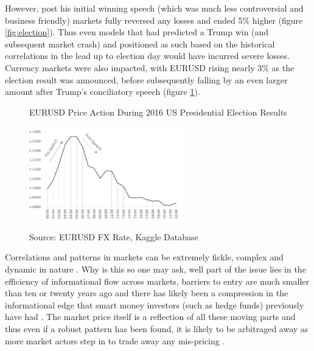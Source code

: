 \documentclass[11pt]{article}
\begin{document}
However, post his initial winning speech (which was much less controversial and business friendly) markets fully reversed any losses and ended 5\% higher (figure \ref{fig:election}). Thus even models that had predicted a Trump win (and subsequent market crash) and positioned as such based on the historical correlations in the lead up to election day would have incurred severe losses. Currency markets were also impacted, with EURUSD rising nearly 3\% as the election result was announced, before subsequently falling by an even larger amount after Trump's conciliatory speech (figure \ref{fig:EURElection}). 
\begin{figure}[h]
    \centering
	\caption{EURUSD Price Action During 2016 US Presidential Election Results}
    \includegraphics[width=0.6\textwidth]{ElectionNight}
    \label{fig:EURElection}
	\caption*{\small Source: EURUSD FX Rate, Kaggle Database}
\end{figure}
\par Correlations and patterns in markets can be extremely fickle, complex and dynamic in nature \cite{Camargo2013}. Why is this so one may ask, well part of the issue lies in the efficiency of informational flow across markets, barriers to entry are much smaller than ten or twenty years ago and there has likely been a compression in the informational edge that smart money investors (such as hedge funds) previously have had \cite{hedgefundRets}. The market price itself is a reflection of all these moving parts and thus even if a robust pattern has been found, it is likely to be arbitraged away as more market actors step in to trade away any mis-pricing \cite{Bartram2019}. 
\par
\end{document}
